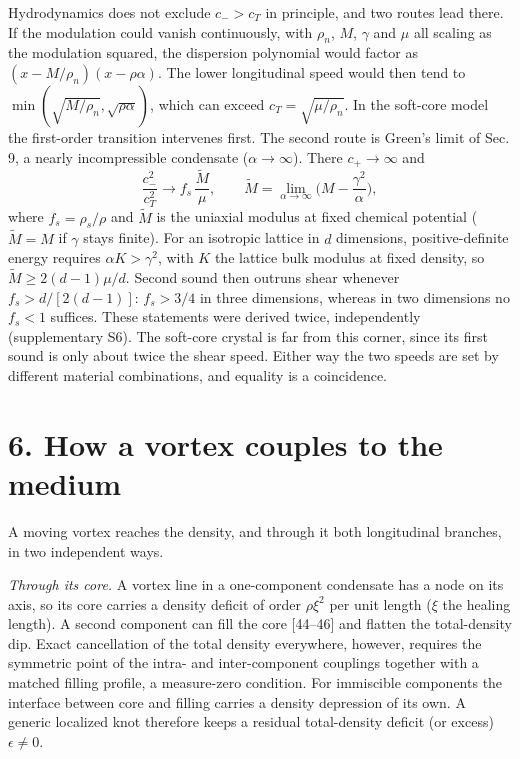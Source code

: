 \documentclass[
  11pt,
]{article}
\begin{document}
Hydrodynamics does not exclude \(c_->c_T\) in principle, and two routes
lead there. If the modulation could vanish continuously, with
\(\rho_n\), \(M\), \(\gamma\) and \(\mu\) all scaling as the modulation
squared, the dispersion polynomial would factor as
\((x-M/\rho_n)(x-\rho\alpha)\). The lower longitudinal speed would then
tend to \(\min(\sqrt{M/\rho_n},\sqrt{\rho\alpha})\), which can exceed
\(c_T=\sqrt{\mu/\rho_n}\). In the soft-core model the first-order
transition intervenes first. The second route is Green's limit of Sec.
9, a nearly incompressible condensate (\(\alpha\to\infty\)). There
\(c_+\to\infty\) and
\[\frac{c_-^2}{c_T^2}\to f_s\,\frac{\tilde M}{\mu},\qquad \tilde M=\lim_{\alpha\to\infty}\Big(M-\frac{\gamma^2}{\alpha}\Big),\]
where \(f_s=\rho_s/\rho\) and \(\tilde M\) is the uniaxial modulus at
fixed chemical potential (\(\tilde M=M\) if \(\gamma\) stays finite).
For an isotropic lattice in \(d\) dimensions, positive-definite energy
requires \(\alpha K>\gamma^2\), with \(K\) the lattice bulk modulus at
fixed density, so \(\tilde M\ge2(d-1)\mu/d\). Second sound then outruns
shear whenever \(f_s>d/[2(d-1)]\): \(f_s>3/4\) in three dimensions,
whereas in two dimensions no \(f_s<1\) suffices. These statements were
derived twice, independently (supplementary S6). The soft-core crystal
is far from this corner, since its first sound is only about twice the
shear speed. Either way the two speeds are set by different material
combinations, and equality is a coincidence.

\hypertarget{how-a-vortex-couples-to-the-medium}{%
\section{6. How a vortex couples to the
medium}\label{how-a-vortex-couples-to-the-medium}}

A moving vortex reaches the density, and through it both longitudinal
branches, in two independent ways.

\emph{Through its core.} A vortex line in a one-component condensate has
a node on its axis, so its core carries a density deficit of order
\(\rho\xi^2\) per unit length (\(\xi\) the healing length). A second
component can fill the core {[}44--46{]} and flatten the total-density
dip. Exact cancellation of the total density everywhere, however,
requires the symmetric point of the intra- and inter-component couplings
together with a matched filling profile, a measure-zero condition. For
immiscible components the interface between core and filling carries a
density depression of its own. A generic localized knot therefore keeps
a residual total-density deficit (or excess) \(\epsilon\neq0\).
\end{document}
